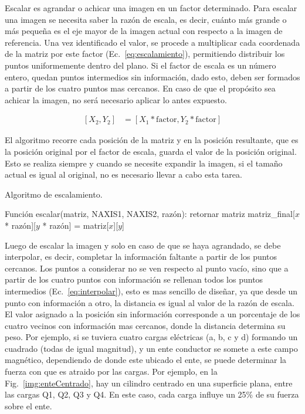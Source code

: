 Escalar es agrandar o achicar una imagen en un factor determinado.
Para escalar una imagen se necesita saber la razón de escala, es
decir, cuánto más grande o más pequeña es el eje mayor de la imagen
actual con respecto a la imagen de referencia. Una vez identificado el
valor, se procede a multiplicar cada coordenada de la matriz por este
factor (Ec.~\ref{eq:escalamiento}), permitiendo distribuir los puntos
uniformemente dentro del plano. Si el factor de escala es un número
entero, quedan puntos intermedios sin información, dado esto, deben
ser formados a partir de los cuatro puntos mas cercanos. En caso de
que el propósito sea achicar la imagen, no será necesario aplicar lo
antes expuesto.

\begin{align}
  \left[X_2,Y_2\right] & = \left[X_1 * \text{factor}, Y_2 *
  \text{factor}\right] \label{eq:escalamiento}
\end{align}

El algoritmo recorre cada posición de la matriz y en la posición
resultante, que es la posición original por el factor de escala,
guarda el valor de la posición original. Esto se realiza siempre y
cuando se necesite expandir la imagen, si el tamaño actual es igual al
original, no es necesario llevar a cabo esta tarea.

\begin{algorithm}
\caption{Algoritmo de escalamiento.}\label{alg:escalamiento}
\label{alg:escalamiento}
\begin{algorithmic}[1]
\STATE Función escalar(matriz, NAXIS1, NAXIS2, razón):
\STATE retornar matriz
\STATE matriz\_final[$x$ * razón][$y$ * razón] = matriz[$x$][$y$]
\ENDWHILE
\ENDWHILE
\ENDIF
\end{algorithmic}
\end{algorithm}

Luego de escalar la imagen y solo en caso de que se haya agrandado, se
debe interpolar, es decir, completar la información faltante a partir
de los puntos cercanos. Los puntos a considerar no se ven respecto al
punto vacío, sino que a partir de los cuatro puntos con información se
rellenan todos los puntos intermedios (Ec.~\ref{eq:interpolar}), esto
es mas sencillo de diseñar, ya que desde un punto con información a
otro, la distancia es igual al valor de la razón de escala. El valor
asignado a la posición sin información corresponde a un porcentaje de
los cuatro vecinos con información mas cercanos, donde la distancia
determina su peso. Por ejemplo, si se tuviera cuatro cargas eléctricas
(a, b, c y d) formando un cuadrado (todas de igual magnitud), y un
ente conductor se somete a este campo magnético, dependiendo de donde
este ubicado el ente, se puede determinar la fuerza con que es atraido
por las cargas. Por ejemplo, en la Fig.~\ref{img:enteCentrado}, hay un
cilindro centrado en una superficie plana, entre las cargas Q1, Q2, Q3
y Q4. En este caso, cada carga influye un 25\% de su fuerza sobre el ente.

